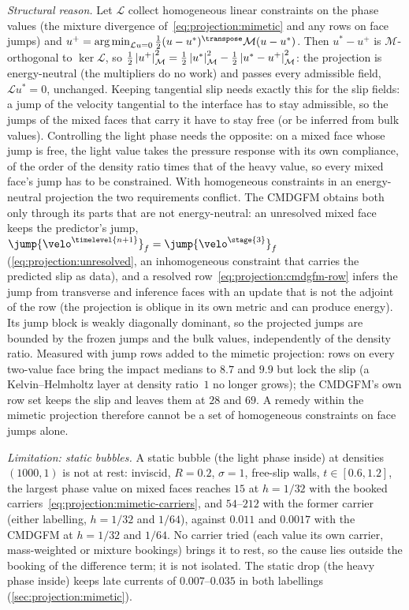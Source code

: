 \emph{Structural reason.} Let $\mathcal L$ collect homogeneous linear
constraints on the phase values (the mixture divergence
of~\cref{eq:projection:mimetic} and any rows on face jumps) and
$u^{+}=\operatorname*{arg\,min}_{\mathcal Lu=0}\tfrac12(u-u^{*})^{\transpose}\mathcal M(u-u^{*})$.
Then $u^{*}-u^{+}$ is $\mathcal M$-orthogonal to $\ker\mathcal L$, so
$\tfrac12\left\lvert u^{+} \right\rvert^2_{\mathcal M}=\tfrac12\left\lvert u^{*} \right\rvert^2_{\mathcal M}-\tfrac12\left\lvert u^{*}-u^{+} \right\rvert^2_{\mathcal M}$:
the projection is energy-neutral (the multipliers do no work) and passes every
admissible field, $\mathcal Lu^{*}=0$, unchanged. Keeping tangential slip needs
exactly this for the slip fields: a jump of the velocity tangential to the
interface has to stay admissible, so the jumps of the mixed faces that carry
it have to stay free (or be inferred from bulk values). Controlling the light
phase needs the opposite: on a mixed face whose jump is free, the light value
takes the pressure response with its own compliance, of the order of the
density ratio times that of the heavy value, so every mixed face's jump has to
be constrained. With homogeneous constraints in an energy-neutral projection
the two requirements conflict. The CMDGFM obtains both only through its parts
that are not energy-neutral: an unresolved mixed face keeps the predictor's
jump, $\jump{\velo^{\timelevel{n+1}}}_f=\jump{\velo^{\stage{3}}}_f$
(\cref{eq:projection:unresolved}, an inhomogeneous constraint that carries the
predicted slip as data), and a resolved row~\cref{eq:projection:cmdgfm-row}
infers the jump from transverse and inference faces with an update that is
not the adjoint of the row (the projection is oblique in its own metric and
can produce energy). Its jump block is weakly diagonally dominant, so the
projected jumps are bounded by the frozen jumps and the bulk values,
independently of the density ratio. Measured with jump rows added to the
mimetic projection: rows on every two-value face bring the impact medians to
$8.7$ and $9.9$ but lock the slip (a Kelvin--Helmholtz layer at density
ratio~$1$ no longer grows); the CMDGFM's own row set keeps the slip and leaves
them at $28$ and $69$. A remedy within the mimetic projection therefore cannot
be a set of homogeneous constraints on face jumps alone.

\emph{Limitation: static bubbles.} A static bubble (the light phase inside) at
densities $(1000,1)$ is not at rest: inviscid, $R=0.2$, $\sigma=1$, free-slip
walls, $t\in[0.6,1.2]$, the largest phase value on mixed faces reaches $15$ at
$h=1/32$ with the booked carriers~\cref{eq:projection:mimetic-carriers}, and
$54$--$212$ with the former carrier (either labelling, $h=1/32$ and $1/64$),
against $0.011$ and $0.0017$ with the CMDGFM at $h=1/32$ and $1/64$. No
carrier tried (each value its own carrier, mass-weighted or mixture
bookings) brings it to rest, so the cause lies outside the booking of the
difference term; it is not isolated. The static drop (the heavy phase
inside) keeps late currents of $0.007$--$0.035$ in both labellings
(\cref{sec:projection:mimetic}).

